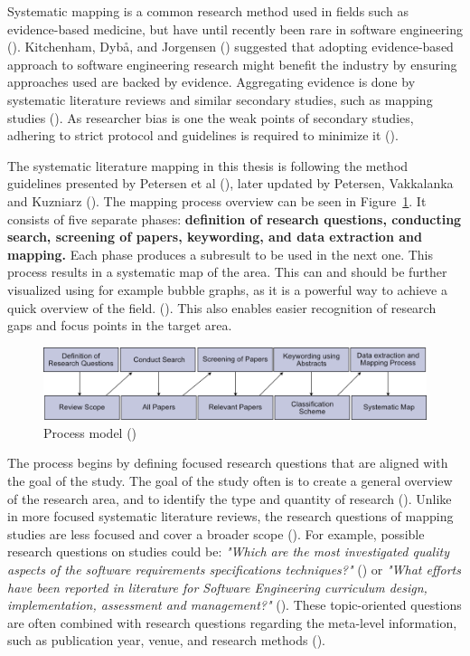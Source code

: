 \documentclass[utf8,english]{gradu3}
\begin{document}
Systematic mapping is a common research method used in fields such as
evidence-based medicine, but have until recently been rare in software
engineering (\cite{petersen2008}). Kitchenham, Dybå, and Jorgensen
(\cite*{kitchenham2004}) suggested that adopting evidence-based approach to
software engineering research might benefit the industry by ensuring approaches
used are backed by evidence. Aggregating evidence is done by systematic
literature reviews and similar secondary studies, such as mapping studies
(\cite{kitchenham2010}). As researcher bias is one the weak points of secondary
studies, adhering to strict protocol and guidelines is required to minimize it
(\cite{brereton2007}).


The systematic literature mapping in this thesis is following the method
guidelines presented by Petersen et al (\cite*{petersen2008}), later updated by
Petersen, Vakkalanka and Kuzniarz (\cite*{petersen2015}). The mapping process
overview can be seen in Figure~\ref{fig:mapping}. It consists of five separate
phases: \textbf{definition of research questions, conducting search, screening
of papers, keywording, and data extraction and mapping.} Each phase produces a
subresult to be used in the next one. This process results in a systematic map
of the area. This can and should be further visualized using for example bubble
graphs, as it is a powerful way to achieve a quick overview of the field.
(\cite{petersen2008}). This also enables easier recognition of research gaps and
focus points in the target area.


\begin{figure}[H]
  \includegraphics[width=\linewidth]{images/petersen_model.png}
  \caption{Process model (\cite{petersen2008})}
  \label{fig:mapping}
\end{figure}

The process begins by defining focused research questions that are aligned with
the goal of the study. The goal of the study often is to create a general
overview of the research area, and to identify the type and quantity of research
(\cite{petersen2008}). Unlike in more focused systematic literature reviews, the
research questions of mapping studies are less focused and cover a broader scope
(\cite{kitchenham2010}). For example, possible research questions on studies
could be: \emph{"Which are the most investigated quality aspects of the software
  requirements specifications techniques?"} (\cite{condori2009}) or \emph{"What
  efforts have been reported in literature for Software Engineering curriculum
  design, implementation, assessment and management?"} (\cite{qadir2011}). These
topic-oriented questions are often combined with research questions regarding
the meta-level information, such as publication year, venue, and research
methods (\cite{petersen2015}).
\end{document}
